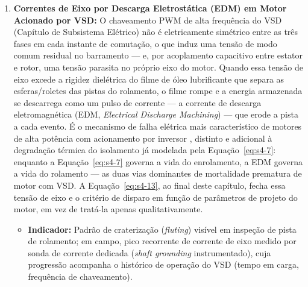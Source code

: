 \documentclass[12pt,a4paper]{article}
\numberwithin{equation}{section}
\numberwithin{table}{section}
\numberwithin{figure}{section}
\begin{document}
{\begin{enumerate}
		\begin{equation}\label{eq:s4-8}
		\begin{aligned}
			VU &= 100 \cdot \frac{\max_i |V_{L,i} - \bar{V}_L|}{\bar{V}_L} \\[6pt]
			IU &= 100 \cdot \frac{\max_i |I_i - \bar{I}|}{\bar{I}} \\[6pt]
			\Delta T_{\text{fases}} &= \max(T_1, T_2, T_3) - \min(T_1, T_2, T_3)
		\end{aligned}
		\end{equation}
		Onde $\bar{V}_L$ e $\bar{I}$ são as médias das três tensões de linha e das três correntes de fase, respectivamente. Um $IU$ persistente acima de poucos pontos percentuais mesmo com $VU$ pequeno — sintoma que a corrente de linha agregada sozinha não capta — já justifica investigação de curto entre espiras ou conexão frouxa no painel.
		\item \textbf{Correntes de Eixo por Descarga Eletrostática (EDM) em Motor Acionado por VSD:} O chaveamento PWM de alta frequência do VSD (Capítulo de Subsistema Elétrico) não é eletricamente simétrico entre as três fases em cada instante de comutação, o que induz uma tensão de modo comum residual no barramento — e, por acoplamento capacitivo entre estator e rotor, uma tensão parasita no próprio eixo do motor. Quando essa tensão de eixo excede a rigidez dielétrica do filme de óleo lubrificante que separa as esferas/roletes das pistas do rolamento, o filme rompe e a energia armazenada se descarrega como um pulso de corrente — a corrente de descarga eletromagnética (EDM, \textit{Electrical Discharge Machining}) — que erode a pista a cada evento. É o mecanismo de falha elétrica mais característico de motores de alta potência com acionamento por inversor \cite{erdman}, distinto e adicional à degradação térmica do isolamento já modelada pela Equação~\eqref{eq:s4-7}: enquanto a Equação~\eqref{eq:s4-7} governa a vida do enrolamento, a EDM governa a vida do rolamento — as duas vias dominantes de mortalidade prematura de motor com VSD. A Equação~\eqref{eq:s4-13}, ao final deste capítulo, fecha essa tensão de eixo e o critério de disparo em função de parâmetros de projeto do motor, em vez de tratá-la apenas qualitativamente.
		\begin{itemize}
			\item \textbf{Indicador:} Padrão de craterização (\textit{fluting}) visível em inspeção de pista de rolamento; em campo, pico recorrente de corrente de eixo medido por sonda de corrente dedicada (\textit{shaft grounding} instrumentado), cuja progressão acompanha o histórico de operação do VSD (tempo em carga, frequência de chaveamento).

\end{itemize}
\end{enumerate}}
\end{document}
